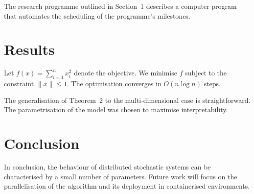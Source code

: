 \documentclass{article}
\begin{document}
The research programme outlined in Section~1 describes a computer program that
automates the scheduling of the programme's milestones.

\section{Results}

Let $f(x) = \sum_{i=1}^{n} x_i^2$ denote the objective.  We minimise $f$ subject
to the constraint $\|x\| \le 1$.  The optimisation converges in $O(n \log n)$ steps.

The generalisation of Theorem~2 to the multi-dimensional case is straightforward.
The parametrisation of the model was chosen to maximise interpretability.

\section{Conclusion}

In conclusion, the behaviour of distributed stochastic systems can be characterised
by a small number of parameters.  Future work will focus on the parallelisation of
the algorithm and its deployment in containerised environments.
\end{document}
